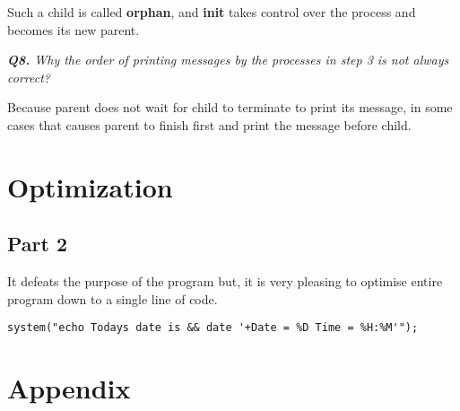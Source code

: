 \documentclass[11pt]{article}
\begin{document}
Such a child is called \textbf{orphan}, and \textbf{init} takes control over the process and becomes its new parent.

\vspace{5mm}
\textit{\textbf{Q8.} Why the order of printing messages by the processes in step 3 is not always correct?}
\vspace{5mm}

Because parent does not wait for child to terminate to print its message, in some cases that causes parent to finish first and print the message before child.

\section*{Optimization}

\subsection*{Part 2}

It defeats the purpose of the program but, it is very pleasing to optimise entire program down to a single line of code.

\vspace{2mm}
\begin{minipage}{1\textwidth}
\begin{lstlisting}[frame=tlrb]
system("echo Todays date is && date '+Date = %D Time = %H:%M'");
\end{lstlisting}
\end{minipage}

\newpage

\section*{Appendix}

\thispagestyle{empty}
\end{document}
